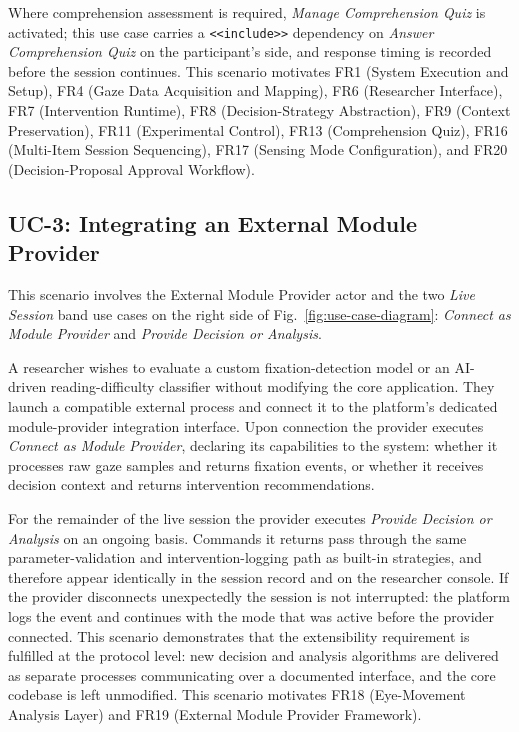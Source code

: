 Where comprehension assessment is required, \textit{Manage Comprehension Quiz}
is activated; this use case carries a \texttt{<<include>>} dependency on
\textit{Answer Comprehension Quiz} on the participant's side, and response
timing is recorded before the session continues.
This scenario motivates FR1 (System Execution and Setup), FR4 (Gaze Data Acquisition and Mapping), FR6 (Researcher Interface), FR7 (Intervention Runtime), FR8 (Decision-Strategy Abstraction), FR9 (Context Preservation), FR11 (Experimental Control), FR13 (Comprehension Quiz), FR16 (Multi-Item Session Sequencing), FR17 (Sensing Mode Configuration), and FR20 (Decision-Proposal Approval Workflow).

\subsection{UC-3: Integrating an External Module Provider}
\label{sec:uc3}

This scenario involves the External Module Provider actor and the two
\textit{Live Session} band use cases on the right side of
Fig.~\ref{fig:use-case-diagram}: \textit{Connect as Module Provider} and
\textit{Provide Decision or Analysis}.

A researcher wishes to evaluate a custom fixation-detection model or an
AI-driven reading-difficulty classifier without modifying the core application.
They launch a compatible external process and connect it to the platform's
dedicated module-provider integration interface.
Upon connection the provider executes \textit{Connect as Module Provider},
declaring its capabilities to the system: whether it processes raw gaze samples
and returns fixation events, or whether it receives decision context and returns
intervention recommendations.

For the remainder of the live session the provider executes \textit{Provide
Decision or Analysis} on an ongoing basis.
Commands it returns pass through the same parameter-validation and
intervention-logging path as built-in strategies, and therefore appear
identically in the session record and on the researcher console.
If the provider disconnects unexpectedly the session is not interrupted: the
platform logs the event and continues with the mode that was active before the
provider connected.
This scenario demonstrates that the extensibility requirement is fulfilled at
the protocol level: new decision and analysis algorithms are delivered as
separate processes communicating over a documented interface, and the core
codebase is left unmodified.
This scenario motivates FR18 (Eye-Movement Analysis Layer) and FR19 (External Module Provider Framework).

